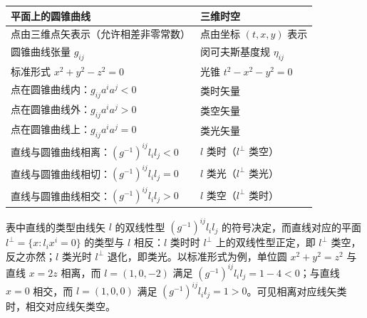 \begin{center}
\begin{tabular}{ll}
\toprule
平面上的圆锥曲线 & 三维时空 \\
\midrule
点由三维点矢表示（允许相差非零常数） & 点由坐标 $(t,x,y)$ 表示 \\
圆锥曲线张量 $g_{ij}$ & 闵可夫斯基度规 $\eta_{ij}$ \\
标准形式 $x^2+y^2-z^2=0$ & 光锥 $t^2-x^2-y^2=0$ \\
点在圆锥曲线内：$g_{ij}a^ia^j<0$ & 类时矢量 \\
点在圆锥曲线外：$g_{ij}a^ia^j>0$ & 类空矢量 \\
点在圆锥曲线上：$g_{ij}a^ia^j=0$ & 类光矢量 \\
直线与圆锥曲线相离：$(g^{-1})^{ij}l_il_j<0$ & $l$ 类时（$l^\perp$ 类空） \\
直线与圆锥曲线相切：$(g^{-1})^{ij}l_il_j=0$ & $l$ 类光（$l^\perp$ 类光） \\
直线与圆锥曲线相交：$(g^{-1})^{ij}l_il_j>0$ & $l$ 类空（$l^\perp$ 类时） \\
\bottomrule
\end{tabular}
\end{center}

\begin{remark}
表中直线的类型由线矢 $l$ 的双线性型 $(g^{-1})^{ij}l_il_j$ 的符号决定，而直线对应的平面
$l^\perp=\{x:l_ix^i=0\}$ 的类型与 $l$ 相反：$l$ 类时时 $l^\perp$ 上的双线性型正定，即 $l^\perp$
类空，反之亦然；$l$ 类光时 $l^\perp$ 退化，即类光。以标准形式为例，单位圆 $x^2+y^2=z^2$ 与直线
$x=2z$ 相离，而 $l=(1,0,-2)$ 满足 $(g^{-1})^{ij}l_il_j=1-4<0$；与直线 $x=0$ 相交，而
$l=(1,0,0)$ 满足 $(g^{-1})^{ij}l_il_j=1>0$。可见相离对应线矢类时，相交对应线矢类空。
\end{remark}
